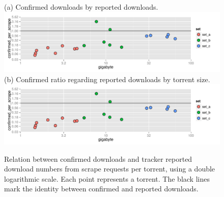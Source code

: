 \documentclass[10pt, a4paper, twoside, headsepline]{scrbook}
\renewcommand{\_}{\origunderscore\allowbreak}
\begin{document}
\begin{figure}
\centering
(a) Confirmed downloads by reported downloads.
\includegraphics[width=\textwidth, page=2]{../result/2015-08-30_20-combined_download_confirmed_scrape}
(b) Confirmed ratio regarding reported downloads by torrent size.
\includegraphics[width=\textwidth, page=1]{../result/2015-08-30_20-combined_download_confirmed_scrape}
\caption[Download numbers: Confirmed vs. scrape request]{Relation between confirmed downloads and tracker reported download numbers from scrape requests per torrent, using a double logarithmic scale. Each point represents a torrent. The black lines mark the identity between confirmed and reported downloads.}
\label{confirmed-scrape}
\end{figure}
\end{document}
